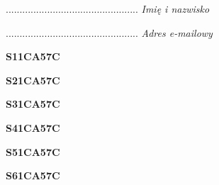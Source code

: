 \begin{turn}{90}\begin{minipage}{\linewidth} \vspace{20mm} ................................................  \textit{Imię i nazwisko}\end{minipage}\end{turn}

\begin{turn}{90}\begin{minipage}{\linewidth} \vspace{20mm} ................................................  \textit{Adres e-mailowy}\end{minipage}\end{turn}

\begin{turn}{90}\huge \begin{minipage}{\linewidth} \vspace{10mm}\textbf{S11CA57C}\end{minipage}\end{turn}

\begin{turn}{90}\huge \begin{minipage}{\linewidth} \vspace{10mm}\textbf{S21CA57C}\end{minipage}\end{turn}

\begin{turn}{90}\huge \begin{minipage}{\linewidth} \vspace{10mm}\textbf{S31CA57C}\end{minipage}\end{turn}

\begin{turn}{90}\huge \begin{minipage}{\linewidth} \vspace{10mm}\textbf{S41CA57C}\end{minipage}\end{turn}

\begin{turn}{90}\huge \begin{minipage}{\linewidth} \vspace{10mm}\textbf{S51CA57C}\end{minipage}\end{turn}

\begin{turn}{90}\huge \begin{minipage}{\linewidth} \vspace{10mm}\textbf{S61CA57C}\end{minipage}\end{turn}

